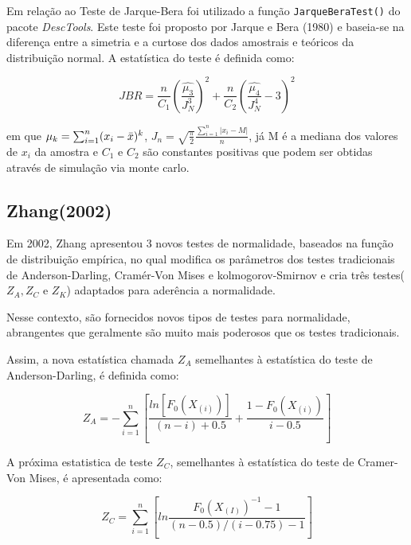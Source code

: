 \documentclass[a4paper,11pt]{article} %
\begin{document}
Em relação ao Teste de Jarque-Bera foi utilizado a função  \texttt{JarqueBeraTest()} do pacote \textit{DescTools}. Este teste foi proposto por Jarque e Bera (1980) e baseia-se na diferença entre a simetria e a curtose dos dados amostrais e teóricos da distribuição normal. A estatística do teste é definida como: 

\begin{equation}
    JBR = \frac{n}{C_{1}} \left( \frac{\hat{\mu_{3}}}{J^{3}_{N}}  \right)^{2} + \frac{n}{C_{2}} \left( \frac{ \hat{\mu_{4}}}{J^{4}_{N}} - 3 \right)^{2} 
\end{equation}


em que $\mu_{k} = \sum_{i=1}^{n} (x_{i}- \Bar{x})^{k}$, $J_{n} = \sqrt{\frac{\pi}{2}}\frac{\sum_{i=1}^{n}|x_{i}-M|}{n}$, já M é a mediana dos valores de $x_{i}$ da amostra e $C_{1}$ e $C_{2}$ são constantes positivas que podem ser obtidas através de simulação via monte carlo. \vskip0.3cm

\subsection{Zhang(2002)}

Em 2002, Zhang apresentou 3 novos testes de normalidade, baseados na função de distribuição empírica, no qual modifica os parâmetros dos testes tradicionais de Anderson-Darling, Cramér-Von Mises e kolmogorov-Smirnov e cria três testes($Z_{A}, Z_{C}$ e $Z_{K}$) adaptados para aderência a normalidade.\vskip0.3cm

Nesse contexto, são fornecidos novos tipos de testes para normalidade, abrangentes que geralmente são muito mais poderosos que os testes tradicionais. \vskip0.3cm

Assim, a nova estatística chamada $Z_{A}$ semelhantes à estatística do teste de Anderson-Darling, é definida como:

\begin{equation}
    Z_{A} = - \sum_{i=1}^{n} \left[  \frac{ln [F_{0}(X_{(i)})]}{(n-i)+0.5} + \frac{1-F_{0}(X_{(i)})}{i-0.5}  \right]  
\end{equation}

A próxima estatistica de teste $Z_{C}$, semelhantes à estatística do teste de Cramer-Von Mises, é apresentada como:

\begin{equation}
    Z_{C} = \sum_{i=1}^{n}  \left[ln  \frac{F_{0}(X_{(I)})^{-1}-1}{(n-0.5)/(i-0.75)-1} \right]
\end{equation}
\end{document}
